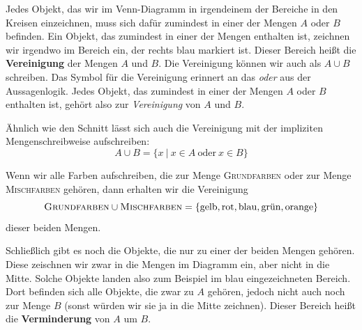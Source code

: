 \documentclass[../../main.tex]{subfiles}
\begin{document}
Jedes Objekt, das wir im Venn-Diagramm in irgendeinem der Bereiche in den Kreisen einzeichnen, muss sich dafür zumindest in einer der Mengen $A$ oder $B$ befinden. Ein Objekt, das zumindest in einer der Mengen enthalten ist, zeichnen wir irgendwo im Bereich ein, der rechts blau markiert ist. Dieser Bereich heißt die \textbf{Vereinigung} der Mengen $A$ und $B$. Die Vereinigung können wir auch als $A\cup B$ schreiben. Das Symbol für die Vereinigung erinnert an das \emph{oder} aus der Aussagenlogik. Jedes Objekt, das zumindest in einer der Mengen $A$ oder $B$ enthalten ist, gehört also zur \emph{Vereinigung} von $A$ und $B$.

Ähnlich wie den Schnitt lässt sich auch die Vereinigung mit der impliziten Mengenschreibweise aufschreiben:
\[A\cup B=\{x~|~x\in A~\text{oder}~x\in B\}\]

\begin{example}{}
    Wenn wir alle Farben aufschreiben, die zur Menge \textsc{Grundfarben} oder zur Menge \textsc{Mischfarben} gehören, dann erhalten wir die Vereinigung
    \[\textsc{Grundfarben}\cup\textsc{Mischfarben}=\{\text{gelb},\text{rot},\text{blau},\text{grün},\text{orange}\}\]
    dieser beiden Mengen.
\end{example}

Schließlich gibt es noch die Objekte, die nur zu einer der beiden Mengen gehören. Diese zeischnen wir zwar in die Mengen im Diagramm ein, aber nicht in die Mitte. Solche Objekte landen also zum Beispiel im blau eingezeichneten Bereich. Dort befinden sich alle Objekte, die zwar zu $A$ gehören, jedoch nicht auch noch zur Menge $B$ (sonst würden wir sie ja in die Mitte zeichnen). Dieser Bereich heißt die \textbf{Verminderung} von $A$ um $B$.
\end{document}
